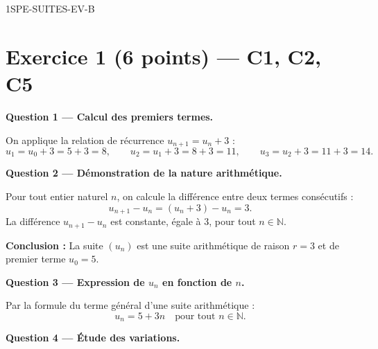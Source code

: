 
\begin{corrige}{1SPE-SUITES-EV-B}

\section*{Exercice 1 \hfill (6 points) — C1, C2, C5}


\bigskip
\textbf{Question 1 — Calcul des premiers termes.}


On applique la relation de récurrence $u_{n+1} = u_n + 3$ :
\[
  u_1 = u_0 + 3 = 5 + 3 = 8, \qquad
  u_2 = u_1 + 3 = 8 + 3 = 11, \qquad
  u_3 = u_2 + 3 = 11 + 3 = 14.
\]

\medskip
\textbf{Question 2 — Démonstration de la nature arithmétique.}


Pour tout entier naturel $n$, on calcule la différence entre deux termes consécutifs :
\[
  u_{n+1} - u_n = (u_n + 3) - u_n = 3.
\]
La différence $u_{n+1} - u_n$ est constante, égale à $3$, pour tout $n \in \mathbb{N}$.

\textbf{Conclusion :} La suite $(u_n)$ est une suite arithmétique de raison $r = 3$ et de premier terme $u_0 = 5$.

\medskip
\textbf{Question 3 — Expression de $u_n$ en fonction de $n$.}


Par la formule du terme général d'une suite arithmétique :
\[
  \boxed{u_n = 5 + 3n} \quad \text{pour tout } n \in \mathbb{N}.
\]

\medskip
\textbf{Question 4 — Étude des variations.}


\end{corrige}
